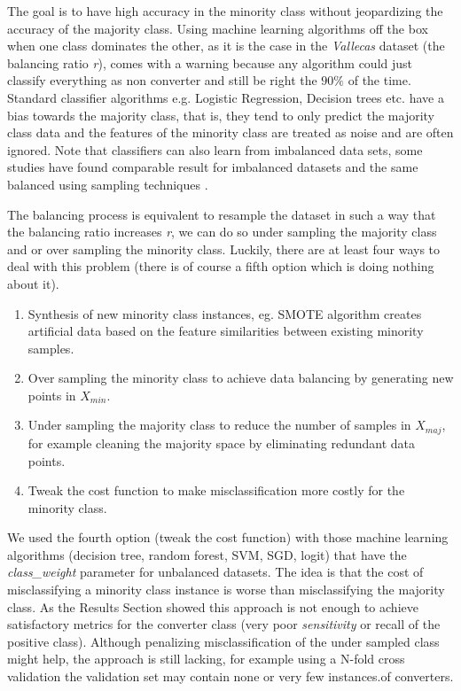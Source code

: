 \documentclass[11pt]{article}
\theoremstyle{definition}
\theoremstyle{remark}
\begin{document}
The goal is to have high accuracy in the minority class without jeopardizing the accuracy of the majority class. Using machine learning algorithms off the box when one class dominates the other, as it is the case in the \emph{Vallecas} dataset (the balancing ratio \emph{r}), comes with a warning because any algorithm could just classify everything as non converter and still be right the $90\%$ of the time. Standard classifier algorithms e.g. Logistic Regression, Decision trees etc. have a bias towards the majority class, that is, they tend to only predict the majority class data and the features of the minority class are treated as noise and are often ignored. Note that classifiers can also learn from imbalanced data sets, some studies have found comparable result for imbalanced datasets and the same balanced using sampling techniques \cite{japkowicz2002class}.

The balancing process is equivalent to resample the dataset in such a way that the balancing ratio increases \emph{r}, we can do so under sampling the majority class and or over sampling the minority class. Luckily, there are at least four ways to deal with this problem (there is of course a fifth option which is doing nothing about it). 
\begin{enumerate}
	\item Synthesis of new minority class instances, eg. SMOTE algorithm creates artificial data based on the feature similarities between existing minority samples. %
	\item Over sampling the minority class to achieve data balancing by generating new points in $X_{min}$.
	\item Under sampling the majority class to reduce the number of samples in $X_{maj}$, for example cleaning the majority space by eliminating redundant data points.
	\item Tweak the cost function to make misclassification more costly for the minority class.
\end{enumerate}
We used the fourth option (tweak the cost function) with those machine learning algorithms (decision tree, random forest, SVM, SGD, logit) that have the \textit{class\_weight} parameter for unbalanced datasets. The idea is that the cost of misclassifying a minority class instance is worse than misclassifying the majority class. 
As the Results Section showed this approach is not enough to achieve satisfactory metrics for the converter class (very poor \emph{sensitivity} or recall of the positive class). Although penalizing misclassification of the under sampled class might help, the approach is still lacking, for example using a N-fold cross validation the validation set may contain none or very few instances.of converters.
\end{document}
